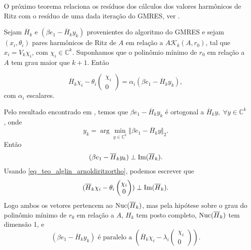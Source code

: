O pr\'{o}ximo teorema relaciona os resíduos dos cálculos dos valores harmônicos de Ritz com o resíduo
de uma dada iteração do GMRES, ver \cite{Morgan00Implicitly}.
\begin{teore}\label{teo_alglin_gmresparallel}
Sejam $\overline{H}_k $ e $(\beta e_1-\overline{H}_k y_k)$ provenientes do algoritmo do GMRES e sejam $(x_i,\theta_i)$  pares harmônicos de Ritz de $A$ em relação a $A\mathcal{K}_k(A,r_0)$, tal que $x_i=V_k\chi_i$, com $\chi_i\in\mathbb{C}^k$. Suponhamos que o polinômio mínimo de $r_0$   em relação a $A$ tem grau maior que $k+1$. Então


\begin{equation}\label{eq_arnolditeo3}
\overline{H}_k \chi_i -\theta_i\begin{pmatrix} \chi_i\\0 \end{pmatrix}=
\alpha_i(\beta e_1-\overline{H}_k y_k),
\end{equation}
com $\alpha_i$ escalares.
\end{teore}
\dem
Pelo resultado encontrado em \cite[corolário 1.39 do teorema 1.38, pág. 36]{Saad03Iterative}, temos que $\beta e_1-\overline{H}_k y_k$
é ortogonal a  $\overline{H}_k y,\;\forall y\in\mathbb{C}^k$, onde
\[
y_k= \arg\underset{y\in\mathbb{C}^k}{\min}
\Vert \beta e_1-\overline{H}_k y\Vert_2.
\] Então
\[
(\beta e_1-\overline{H}_k y_k)\perp \operatorname{Im}(\overline{H}_k).
\]
 Usando \eqref{eq_teo_alglin_arnoldiritzortho}, podemos escrever que
\[
(\overline{H}_k \chi_i -\theta_i\begin{pmatrix} \chi_i\\0 \end{pmatrix}) \perp \operatorname{Im}(\overline{H}_k)
.\]
Logo ambos os vetores pertencem ao $\operatorname{Nuc}(\overline{H}_k)$, mas pela hip\'{o}tese sobre o grau do polinômio mínimo de $r_0$ em relação a $A$, $H_k$ tem posto completo,
$\operatorname{Nuc}(\overline{H}_k)$ tem dimensão 1, e
\[(\beta e_1-\overline{H}_k y_k) \text{ é paralelo a }
(\overline{H}_k \chi_i -\lambda_i\begin{pmatrix} \chi_i\\0 \end{pmatrix}).
\]
\fim


